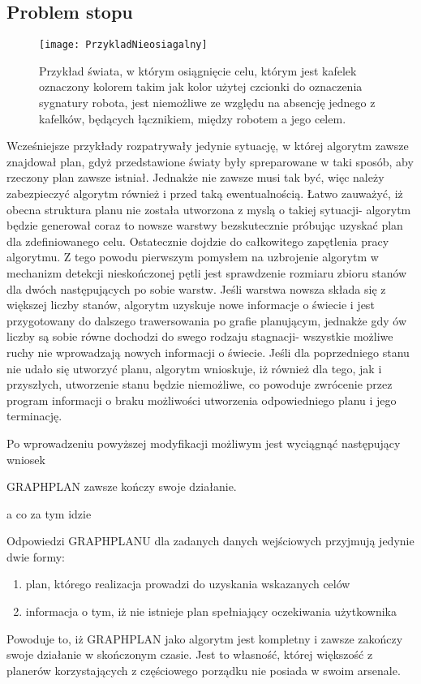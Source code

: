     \subsection{Problem stopu}
    \begin{figure}[H]
        \texttt{[image: PrzykladNieosiagalny]}
        \centering
        \caption{Przykład świata, w którym osiągnięcie celu, którym jest kafelek oznaczony kolorem takim jak kolor użytej czcionki do oznaczenia 
        sygnatury robota, jest niemożliwe ze względu na absencję jednego z kafelków, będących łącznikiem, między robotem a jego celem.}
        \label{PrzykladPlanW1}
    \end{figure}
    Wcześniejsze przykłady rozpatrywały jedynie sytuację, w której algorytm zawsze znajdował plan, gdyż przedstawione światy były spreparowane w taki sposób, 
    aby rzeczony plan zawsze istniał. Jednakże nie zawsze musi tak być, więc należy zabezpieczyć algorytm również i przed taką ewentualnością. Łatwo zauważyć, 
    iż obecna struktura planu nie została utworzona z myslą o takiej sytuacji- algorytm będzie generował coraz to nowsze warstwy bezskutecznie próbując uzyskać 
    plan dla zdefiniowanego celu. Ostatecznie dojdzie do całkowitego zapętlenia pracy algorytmu. 
    Z tego powodu pierwszym pomysłem na uzbrojenie algorytm w mechanizm detekcji nieskończonej pętli jest sprawdzenie rozmiaru zbioru stanów dla dwóch 
    następujących po sobie warstw. Jeśli warstwa nowsza składa się z większej liczby stanów, algorytm uzyskuje nowe informacje o świecie i jest 
    przygotowany do dalszego trawersowania po grafie planującym, jednakże gdy ów liczby są sobie równe dochodzi do swego rodzaju stagnacji- wszystkie 
    możliwe ruchy nie wprowadzają nowych informacji o świecie. Jeśli dla poprzedniego stanu nie udało się utworzyć planu, algorytm wnioskuje, iż 
    również dla tego, jak i przyszłych, utworzenie stanu będzie niemożliwe, co powoduje zwrócenie przez program informacji o braku 
    możliwości utworzenia odpowiedniego planu i jego terminację.

    Po wprowadzeniu powyższej modyfikacji możliwym jest wyciągnąć następujący wniosek 

    \begin{corollary}
        GRAPHPLAN zawsze kończy swoje działanie.
    \end{corollary} 

    a co za tym idzie

    \begin{corollary}
        Odpowiedzi GRAPHPLANU dla zadanych danych wejściowych przyjmują jedynie dwie formy:
        \begin{enumerate}
            \item plan, którego realizacja prowadzi do uzyskania wskazanych celów
            \item informacja o tym, iż nie istnieje plan spełniający oczekiwania użytkownika
        \end{enumerate}
    \end{corollary}

    Powoduje to, iż GRAPHPLAN jako algorytm jest kompletny i zawsze zakończy swoje działanie w skończonym czasie. Jest to własność, której większość 
    z planerów korzystających z częściowego porządku nie posiada w swoim arsenale.


    


